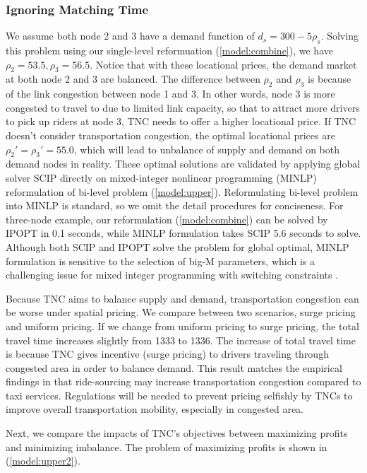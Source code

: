 \documentclass[review]{elsarticle}
\begin{document}
\subsubsection{Ignoring Matching Time}
We assume both node 2 and 3 have a demand function of $d_s = 300 - 5\rho_s$. Solving this problem using our single-level reformuation (\ref{model:combine}), we have $\rho_2 = 53.5, \rho_3 = 56.5$.  Notice that with these locational prices, the demand market at both node 2 and 3 are balanced. The difference between $\rho_2$ and $\rho_3$ is because of the link congestion between node 1 and 3. In other words, node 3 is more congested to travel to due to limited link capacity, so that to attract more drivers to pick up riders at node 3, TNC needs to offer a higher locational price. If TNC doesn't consider transportation congestion, the optimal locational prices are $\rho_2' = \rho_3' = 55.0$, which will lead to unbalance of supply and demand on both demand nodes in reality. These optimal solutions are validated by applying global solver SCIP \citep{achterberg2009scip} directly on mixed-integer nonlinear programming (MINLP) reformulation of bi-level problem (\ref{model:upper}). Reformulating bi-level problem into MINLP is standard, so we omit the detail procedures for conciseness. For three-node example, our reformulation (\ref{model:combine}) can be solved by IPOPT in 0.1 seconds, while MINLP formulation takes SCIP 5.6 seconds to solve. Although both SCIP and IPOPT solve the problem for global optimal, MINLP formulation is sensitive to the selection of big-M parameters, which is a challenging issue for mixed integer programming with switching constraints \citep{guo2016contingency}.

Because TNC aims to balance supply and demand, transportation congestion can be worse under spatial pricing. We compare between two scenarios, surge pricing and uniform pricing. If we change from uniform pricing to surge pricing, the total travel time increases slightly from 1333 to 1336. The increase of total travel time is because TNC gives incentive (surge pricing) to drivers traveling through congested area in order to balance demand. This result matches the empirical findings in \citep{nie2017can} that ride-sourcing may increase transportation congestion compared to taxi services. Regulations will be needed to prevent pricing selfishly by TNCs to improve overall transportation mobility, especially in congested area.

Next, we compare the impacts of TNC's objectives between maximizing profits and minimizing imbalance. The problem of maximizing profits is shown in (\ref{model:upper2}).
\end{document}
